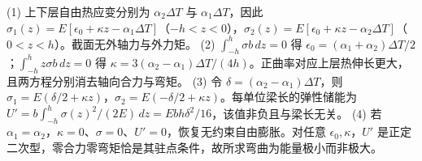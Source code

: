 (1) 上下层自由热应变分别为 \(\alpha_2\Delta T\) 与 \(\alpha_1\Delta T\)，因此 \(\sigma_1(z)=E[\epsilon_0+\kappa z-\alpha_1\Delta T]\)（\(-h<z<0\)），\(\sigma_2(z)=E[\epsilon_0+\kappa z-\alpha_2\Delta T]\)（\(0<z<h\)）。截面无外轴力与外力矩。
(2) \(\int_{-h}^h\sigma b\,dz=0\) 得 \(\epsilon_0=(\alpha_1+\alpha_2)\Delta T/2\)；\(\int_{-h}^h z\sigma b\,dz=0\) 得 \(\kappa=3(\alpha_2-\alpha_1)\Delta T/(4h)\)。正曲率对应上层热伸长更大，且两方程分别消去轴向合力与弯矩。
(3) 令 \(\delta=(\alpha_2-\alpha_1)\Delta T\)，则 \(\sigma_1=E(\delta/2+\kappa z)\)，\(\sigma_2=E(-\delta/2+\kappa z)\)。每单位梁长的弹性储能为 \(U'=b\int_{-h}^h\sigma(z)^2/(2E)\,dz=Eb h\delta^2/16\)，该值非负且与梁长无关。
(4) 若 \(\alpha_1=\alpha_2\)，\(\kappa=0\)、\(\sigma=0\)、\(U'=0\)，恢复无约束自由膨胀。对任意 \(\epsilon_0,\kappa\)，\(U'\) 是正定二次型，零合力零弯矩恰是其驻点条件，故所求弯曲为能量极小而非极大。
